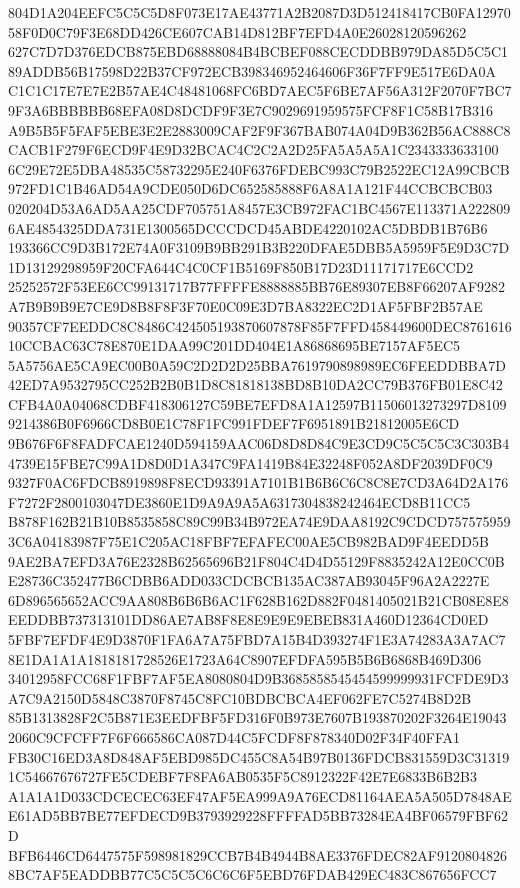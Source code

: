 \documentclass[UTF8,fontset=fandol,zihao=-4,a4paper]{ctexart}
\begin{document}
{{804D1A204EEFC5C5C5D8F073E17AE43771A2B2087D3D512418417CB0FA1297058F0D0C79F3E68DD426CE607CAB14D812BF7EFD4A0E26028120596262
627C7D7D376EDCB875EBD68888084B4BCBEF088CECDDBB979DA85D5C5C189ADDB56B17598D22B37CF972ECB398346952464606F36F7FF9E517E6DA0A
C1C1C17E7E7E2B57AE4C48481068FC6BD7AEC5F6BE7AF56A312F2070F7BC79F3A6BBBBBB68EFA08D8DCDF9F3E7C9029691959575FCF8F1C58B17B316
A9B5B5F5FAF5EBE3E2E2883009CAF2F9F367BAB074A04D9B362B56AC888C8CACB1F279F6ECD9F4E9D32BCAC4C2C2A2D25FA5A5A5A1C2343333633100
6C29E72E5DBA48535C58732295E240F6376FDEBC993C79B2522EC12A99CBCB972FD1C1B46AD54A9CDE050D6DC652585888F6A8A1A121F44CCBCBCB03
020204D53A6AD5AA25CDF705751A8457E3CB972FAC1BC4567E113371A2228096AE4854325DDA731E1300565DCCCDCD45ABDE4220102AC5DBDB1B76B6
193366CC9D3B172E74A0F3109B9BB291B3B220DFAE5DBB5A5959F5E9D3C7D1D13129298959F20CFA644C4C0CF1B5169F850B17D23D11171717E6CCD2
25252572F53EE6CC99131717B77FFFFE8888885BB76E89307EB8F66207AF9282A7B9B9B9E7CE9D8B8F8F3F70E0C09E3D7BA8322EC2D1AF5FBF2B57AE
90357CF7EEDDC8C8486C424505193870607878F85F7FFD458449600DEC876161610CCBAC63C78E870E1DAA99C201DD404E1A86868695BE7157AF5EC5
5A5756AE5CA9EC00B0A59C2D2D2D25BBA7619790898989EC6FEEDDBBA7D42ED7A9532795CC252B2B0B1D8C81818138BD8B10DA2CC79B376FB01E8C42
CFB4A0A04068CDBF418306127C59BE7EFD8A1A12597B11506013273297D81099214386B0F6966CD8B0E1C78F1FC991FDEF7F6951891B21812005E6CD
9B676F6F8FADFCAE1240D594159AAC06D8D8D84C9E3CD9C5C5C5C3C303B44739E15FBE7C99A1D8D0D1A347C9FA1419B84E32248F052A8DF2039DF0C9
9327F0AC6FDCB8919898F8ECD93391A7101B1B6B6C6C8C8E7CD3A64D2A176F7272F2800103047DE3860E1D9A9A9A5A6317304838242464ECD8B11CC5
B878F162B21B10B8535858C89C99B34B972EA74E9DAA8192C9CDCD7575759593C6A04183987F75E1C205AC18FBF7EFAFEC00AE5CB982BAD9F4EEDD5B
9AE2BA7EFD3A76E2328B62565696B21F804C4D4D55129F8835242A12E0CC0BE28736C352477B6CDBB6ADD033CDCBCB135AC387AB93045F96A2A2227E
6D896565652ACC9AA808B6B6B6AC1F628B162D882F0481405021B21CB08E8E8EEDDBB737313101DD86AE7AB8F8E8E9E9E9EBEB831A460D12364CD0ED
5FBF7EFDF4E9D3870F1FA6A7A75FBD7A15B4D393274F1E3A74283A3A7AC78E1DA1A1A1818181728526E1723A64C8907EFDFA595B5B6B6868B469D306
34012958FCC68F1FBF7AF5EA8080804D9B3685858545454599999931FCFDE9D3A7C9A2150D5848C3870F8745C8FC10BDBCBCA4EF062FE7C5274B8D2B
85B1313828F2C5B871E3EEDFBF5FD316F0B973E7607B193870202F3264E190432060C9CFCFF7F6F666586CA087D44C5FCDF8F878340D02F34F40FFA1
FB30C16ED3A8D848AF5EBD985DC455C8A54B97B0136FDCB831559D3C313191C54667676727FE5CDEBF7F8FA6AB0535F5C8912322F42E7E6833B6B2B3
A1A1A1D033CDCECEC63EF47AF5EA999A9A76ECD81164AEA5A505D7848AEE61AD5BB7BE77EFDECD9B3793929228FFFFAD5BB73284EA4BF06579FBF62D
BFB6446CD6447575F598981829CCB7B4B4944B8AE3376FDEC82AF91208048268BC7AF5EADDBB77C5C5C5C6C6C6F5EBD76FDAB429EC483C867656FCC7
}}
\end{document}

